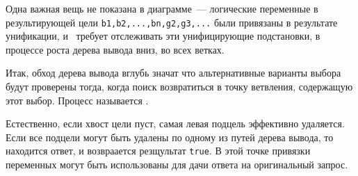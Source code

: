 
Одна важная вещь не показана в диаграмме\ --- логические переменные в
результирующей цели \verb|b1,b2,...,bn,g2,g3,...| были привязаны в результате
унификации, и \prolog\ требует отслеживать эти унифицирующие подстановки, в
процессе роста дерева вывода вниз, во всех ветках.

Итак, обход дерева вывода вглубь значат что альтернативные варианты выбора будут
проверены тогда, когда поиск возвратиться в точку ветвления, содержащую этот
выбор. Процесс называется .

Естественно, если хвост цели пуст, самая левая подцель 
эффективно удаляется. Если все подцели могут быть удалены по одному из путей
дерева вывода, то находится ответ, и возвраается резщультат \verb|true|. В этой
точке привязки переменных могут быть использованы для дачи ответа на
оригинальный запрос.
